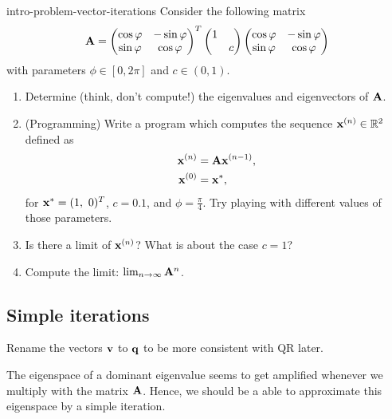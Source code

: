 
\begin{Problem}{intro-problem-vector-iterations}
	Consider the following matrix
	\begin{gather*}
	\mathbf A =
	\begin{pmatrix}
	\cos\varphi & -\sin\varphi\\
	\sin\varphi &  \cos\varphi
	\end{pmatrix}^T
	\begin{pmatrix}
	1 & \\
	& c
	\end{pmatrix}
	\begin{pmatrix}
	\cos\varphi & -\sin\varphi\\
	\sin\varphi &  \cos\varphi
	\end{pmatrix}
	\end{gather*}
	with parameters $\phi\in[0,2\pi]$ and $c\in(0,1)$.
	\begin{enumerate}
		\item Determine (think, don't compute!) the eigenvalues and eigenvectors of $\mathbf A$.
		\item (Programming) Write a program which computes the sequence
		$\mathbf x^{(n)}\in\mathbb R^2$ defined as
		\begin{align*}
		\mathbf x^{(n)} &= \mathbf A \mathbf x^{(n-1)}, \\
		\mathbf x^{(0)} &= \mathbf x^{*},
		\end{align*}
		for $\vx^{*} = (1,\ 0)^T$, $c = 0.1$, and
		$\phi=\frac\pi4$. Try playing with different values of those
		parameters.
		\item Is there a limit of $\mathbf x^{(n)}$? What is about the case
		$c=1$?
		\item Compute the limit: $\lim_{n\to\infty}\mathbf A^n$.
	\end{enumerate}
\end{Problem}

\subsection{Simple iterations}

\begin{todo}
  Rename the vectors $\mathbf v$ to $\mathbf q$ to be more consistent with QR later.
\end{todo}

\begin{intro}
  The eigenspace of a dominant eigenvalue seems to get amplified
  whenever we multiply with the matrix $\mathbf A$. Hence, we should be a
  able to approximate this eigenspace by a simple iteration.
\end{intro}

